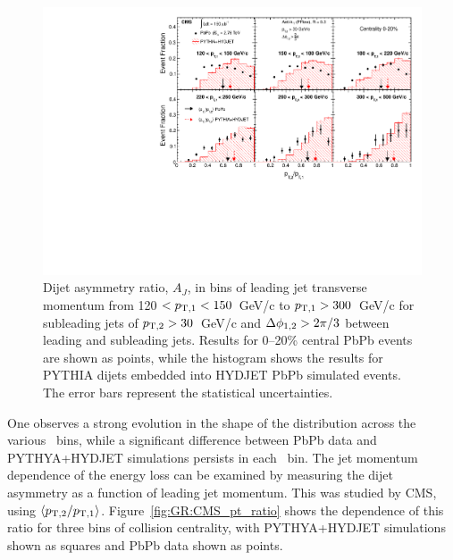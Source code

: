 \begin{figure}[!h]
\begin{center}
\includegraphics[width=0.49\mboxwidth]{jetfigures/dijet_imbalance5_0to20_pt_20120103_subt.pdf}
\caption{Dijet asymmetry ratio, $A_{J}$, in bins of leading jet transverse momentum from
120 $ < p_{\rm{T},1} < 150$~GeV/c to $p_{\rm{T},1} > 300$~GeV/c for
  subleading jets of $p_{\rm{T},2}> 30$~GeV/c
and $\Delta\phi_{1,2}>2\pi/3$ between leading and subleading jets.
Results for 0--20\% central PbPb events are shown as points, while the histogram
shows the results for
PYTHIA dijets embedded into HYDJET PbPb simulated events. The error bars represent the statistical uncertainties.}
\label{fig:GR:CMS_dijet_pt}
\end{center}
\end{figure}
One observes a strong evolution in the shape of the distribution across the
various \pt\ bins, while a significant difference between PbPb data and 
PYTHYA+HYDJET simulations persists in each \pt\ bin. 
The jet momentum dependence of the energy loss can be examined by measuring the
dijet asymmetry as a function of leading jet momentum. This was studied by CMS,
using $\langle p_{\rm{T},2}/p_{\rm{T},1} \rangle$. Figure~\ref{fig:GR:CMS_pt_ratio} 
shows the \pt dependence of this ratio for three 
bins of collision centrality, with PYTHYA+HYDJET simulations shown 
as squares and PbPb data shown as points. 

